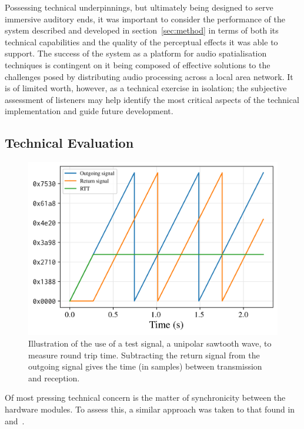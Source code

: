 \documentclass[utf8]{FrontiersinHarvard}
\newcommand{\secref}[1]{section~\ref{#1}}
\begin{document}
    Possessing technical underpinnings, but ultimately being designed to
    serve immersive auditory ends, it was important to consider the performance of
    the system described and developed in \secref{sec:method} in terms of
    both its technical capabilities and the quality of the perceptual effects it
    was able to support.
    The success of the system as a platform for audio spatialisation techniques is
    contingent on it being composed of effective solutions to the challenges posed
    by distributing audio processing across a local area network.
    It is of limited worth, however, as a technical exercise in isolation;
    the subjective assessment of listeners may help identify the most critical
    aspects of the technical implementation and guide future development.

    \subsection{Technical Evaluation}\label{subsec:technical-evaluation}

    \begin{figure}[ht]
        \centering
        \includegraphics[width=.5\textwidth]{figures/test-signal}
        \caption{
            Illustration of the use of a test signal, a unipolar sawtooth wave,
            to measure round trip time.
            Subtracting the return signal from the outgoing signal gives the time
            (in samples) between transmission and reception.
        }
        \label{fig:test-signal}
    \end{figure}
    \noindent
    Of most pressing technical concern is the matter of synchronicity between the
    hardware modules.
    To assess this, a similar approach was taken to that found
    in~\citep{rushton_microcontroller-based_2023}
    and~\citep{gabrielli_networked_2012}.
\end{document}
